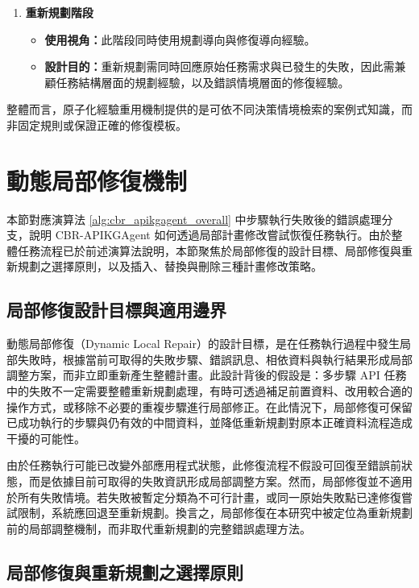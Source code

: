 \begin{ZhChapter}
\begin{enumerate}
    \item \textbf{重新規劃階段}

    \begin{itemize}
        \item \textbf{使用視角：}此階段同時使用規劃導向與修復導向經驗。
        \item \textbf{設計目的：}重新規劃需同時回應原始任務需求與已發生的失敗，因此需兼顧任務結構層面的規劃經驗，以及錯誤情境層面的修復經驗。
    \end{itemize}

\end{enumerate}

整體而言，原子化經驗重用機制提供的是可依不同決策情境檢索的案例式知識，而非固定規則或保證正確的修復模板。

\section{動態局部修復機制}
\label{sec:dynamic_local_repair}

本節對應演算法 \ref{alg:cbr_apikgagent_overall} 中步驟執行失敗後的錯誤處理分支，說明 CBR-APIKGAgent 如何透過局部計畫修改嘗試恢復任務執行。由於整體任務流程已於前述演算法說明，本節聚焦於局部修復的設計目標、局部修復與重新規劃之選擇原則，以及插入、替換與刪除三種計畫修改策略。

\subsection{局部修復設計目標與適用邊界}

動態局部修復（Dynamic Local Repair）的設計目標，是在任務執行過程中發生局部失敗時，根據當前可取得的失敗步驟、錯誤訊息、相依資料與執行結果形成局部調整方案，而非立即重新產生整體計畫。此設計背後的假設是：多步驟 API 任務中的失敗不一定需要整體重新規劃處理，有時可透過補足前置資料、改用較合適的操作方式，或移除不必要的重複步驟進行局部修正。在此情況下，局部修復可保留已成功執行的步驟與仍有效的中間資料，並降低重新規劃對原本正確資料流程造成干擾的可能性。

由於任務執行可能已改變外部應用程式狀態，此修復流程不假設可回復至錯誤前狀態，而是依據目前可取得的失敗資訊形成局部調整方案。然而，局部修復並不適用於所有失敗情境。若失敗被暫定分類為不可行計畫，或同一原始失敗點已達修復嘗試限制，系統應回退至重新規劃。換言之，局部修復在本研究中被定位為重新規劃前的局部調整機制，而非取代重新規劃的完整錯誤處理方法。

\subsection{局部修復與重新規劃之選擇原則}


\end{ZhChapter}

